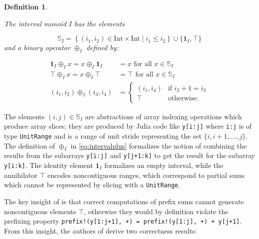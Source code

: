 \documentclass{sig-alternate}
\newcommand{\code}[1]{\texttt{#1}}
\newtheorem{definition}{Definition}
\begin{document}
\begin{definition}{\cite[Definition 4.3]{Chong2014}}
\label{def:intervalmonoid}
	
The \textit{interval monoid} $I$ has the elements

\begin{equation}
	\mathbb S_I = \left\{ (i_1, i_2) \in \mathrm{Int} \times \mathrm{Int} \;\vert\; i_1 \le i_2  \right\} \cup \{\mathbf 1_I, \top \}
\end{equation}
%
and a binary operator $\oplus_I$ defined by:

\begin{subequations}
\begin{align}
	\mathbf 1_I \oplus_I x = x \oplus_I \mathbf 1_I &= x \textrm{ for all } x \in \mathbb S_I \\
	\top \oplus_I x = x \oplus_I \top &= \top \textrm{ for all } x \in \mathbb S_I \\
	(i_1, i_2) \oplus_I (i_3, i_4) &= \begin{cases} (i_1, i_4) &\textrm{if } i_2 + 1 = i_3 \\
		\top &\textrm{otherwise.}
\end{cases}
\label{eq:intervalplus}
\end{align}
\end{subequations}

\end{definition}

The elements $(i, j) \in \mathbb S_I$ are abstractions of array indexing
operations which produce array slices; they are produced by Julia code like
\code{y[i:j]} where \code{i:j} is of type \code{UnitRange} and is a range of
unit stride representing the set $\{i, i+1, \dots, j\}$. The definition of
$\oplus_I$ in \eqref{eq:intervalplus} formalizes the notion of combining the
results from the subarrays \code{y[i:j]} and \code{y[j+1:k]} to get the result
for the subarray \code{y[i:k]}.  The identity element $\mathbf 1_I$ formalizes
an empty interval, while the annihilator $\top$ encodes noncontiguous ranges,
which correspond to partial sums which cannot be represented by slicing with a
\code{UnitRange}.

The key insight of \cite{Chong2014} is that correct computations of prefix sums
cannot generate noncontiguous elements $\top$, otherwise they would by
definition violate the prefixing property \code{prefix!(y[1:j+1], +) =
prefix!(y[1:j], +) + y[j+1]}.\\
From this insight, the authors of \cite{Chong2014} derive two correctness
results:
\end{document}
